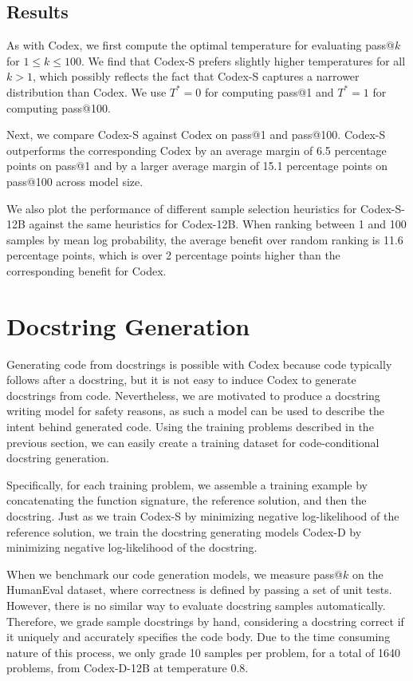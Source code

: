 \subsection{Results}
\label{sec:sup:results}

As with Codex, we first compute the optimal temperature for evaluating pass@$k$ for $1 \leq k \leq 100$. We find that Codex-S prefers slightly higher temperatures for all $k > 1$, which possibly reflects the fact that Codex-S captures a narrower distribution than Codex. We use $T^* = 0$ for computing pass@1 and $T^* = 1$ for computing pass@100.

Next, we compare Codex-S against Codex on pass@1 and pass@100. Codex-S outperforms the corresponding Codex by an average margin of 6.5 percentage points on pass@1 and by a larger average margin of 15.1 percentage points on pass@100 across model size. 

We also plot the performance of different sample selection heuristics for Codex-S-12B against the same heuristics for Codex-12B. When ranking between 1 and 100 samples by mean log probability, the average benefit over random ranking is 11.6 percentage points, which is over 2 percentage points higher than the corresponding benefit for Codex.

\section{Docstring Generation}
\label{sec:doc}

Generating code from docstrings is possible with Codex because code typically follows after a docstring, but it is not easy to induce Codex to generate docstrings from code. Nevertheless, we are motivated to produce a docstring writing model for safety reasons, as such a model can be used to describe the intent behind generated code. Using the training problems described in the previous section, we can easily create a training dataset for code-conditional docstring generation.

Specifically, for each training problem, we assemble a training example by concatenating the function signature, the reference solution, and then the docstring. Just as we train Codex-S by minimizing negative log-likelihood of the reference solution, we train the docstring generating models Codex-D by minimizing negative log-likelihood of the docstring.

When we benchmark our code generation models, we measure pass@$k$ on the HumanEval dataset, where correctness is defined by passing a set of unit tests. However, there is no similar way to evaluate docstring samples automatically. Therefore, we grade sample docstrings by hand, considering a docstring correct if it uniquely and accurately specifies the code body. Due to the time consuming nature of this process, we only grade 10 samples per problem, for a total of 1640 problems, from Codex-D-12B at temperature 0.8.

